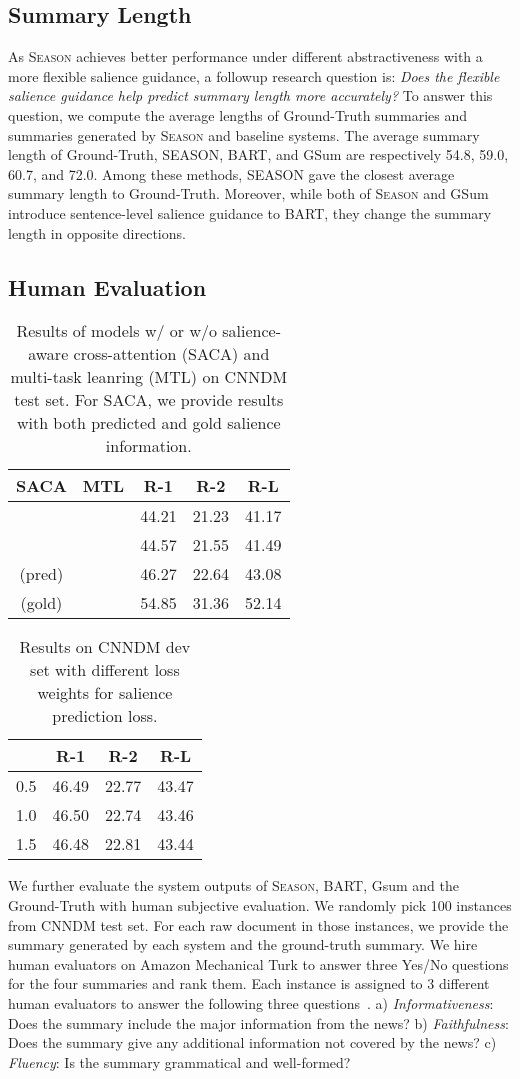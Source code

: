 \documentclass[11pt]{article}
\newcommand{\cmark}{\ding{51}}\newcommand{\xmark}{\ding{55}}
\newcommand{\MODEL}{\mbox{\textsc{Season}}\xspace}
\newcommand{\TABLESALIENCEINJECTION}{
    \begin{table}[!t]
        \centering
        \small
        \begin{tabular}{ccccc}\toprule
            \textbf{SACA} & \textbf{MTL} &\textbf{R-1} &\textbf{R-2} &\textbf{R-L} \\\midrule
            \xmark & \xmark  & 44.21 & 21.23 & 41.17 \\
            \xmark & \cmark & 44.57 & 21.55 & 41.49 \\
            \cmark (pred) & \cmark & 46.27 & 22.64 & 43.08 \\
            \cmark (gold) & \cmark & 54.85 & 31.36 & 52.14 \\
            \bottomrule
        \end{tabular}
        \caption{\small Results of models w/ or w/o salience-aware cross-attention (SACA) and multi-task leanring (MTL) on CNNDM test set. For SACA, we provide results with both predicted and gold salience information.}
        \label{tab:ablation_module}
        \vspace{-0.5em}
    \end{table}
}
\newcommand{\TABLEAUXILIARYTASK}{
    \begin{table}[!t]
    \centering
    \small
    \begin{tabular}{cccc}\toprule
         &\textbf{R-1} &\textbf{R-2} &\textbf{R-L} \\\midrule
        
         0.5 & 46.49 & 22.77 & 43.47 \\
         1.0 & 46.50 & 22.74 & 43.46 \\
         1.5 & 46.48 & 22.81 & 43.44  \\
        \bottomrule
    \end{tabular}
    \caption{\small Results on CNNDM dev set with different loss weights  for salience prediction loss.}
    \label{tab:coefficient}
    \vspace{-1em}
    \end{table}
}
\begin{document}
\subsection{Summary Length}
\label{sec:length}
As \MODEL achieves better performance under different abstractiveness with a more flexible salience guidance, a followup research question is: \textit{Does the flexible salience guidance help predict summary length more accurately?}
To answer this question, we compute the average lengths of Ground-Truth summaries and summaries generated by \MODEL and baseline systems.
The average summary length of Ground-Truth, SEASON, BART, and GSum are respectively 54.8, 59.0, 60.7, and 72.0.
Among these methods, SEASON gave the closest average summary length to Ground-Truth.
Moreover, while both of \MODEL and GSum introduce sentence-level salience guidance to BART, they change the summary length in opposite directions.



\subsection{Human Evaluation}
\label{sec:human}
\TABLESALIENCEINJECTION
\TABLEAUXILIARYTASK

We further evaluate the system outputs of \MODEL, BART, Gsum and the Ground-Truth with human subjective evaluation.
We randomly pick 100 instances from CNNDM test set.
For each raw document in those instances, we provide the summary generated by each system and the ground-truth summary.
We hire human evaluators on Amazon Mechanical Turk to answer three Yes/No questions for the four summaries and rank them.
Each instance is assigned to 3 different human evaluators to answer the following
three questions~\cite{song-etal-2021-new}. 
a) \textit{Informativeness}: Does the summary include the major information from the news? 
b) \textit{Faithfulness}: Does the summary give any additional information not covered by the news? 
c) \textit{Fluency}: Is the summary grammatical and well-formed?
\end{document}
